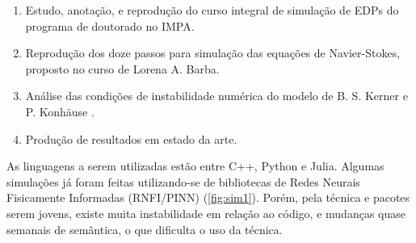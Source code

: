 \documentclass[12pt, brazilian]{article}
\begin{document}
\begin{enumerate}
\item Estudo, anotação, e reprodução do curso integral de simulação de
EDPs do programa de doutorado no IMPA.
\item Reprodução dos doze passos para simulação das equações de
Navier-Stokes, proposto no curso de Lorena A. Barba.








\item Análise das condições de instabilidade numérica do modelo de B. S. Kerner e P. Konhäuse \cite{kerner1993cluster}.
\item Produção de resultados em estado da arte.
\end{enumerate}

As linguagens a serem utilizadas estão entre C++, Python e Julia. Algumas simulações já foram feitas utilizando-se de bibliotecas de Redes Neurais Fisicamente Informadas (RNFI/PINN) (\autoref{fig:sim1}). Porém, pela técnica e pacotes serem jovens, existe muita instabilidade em relação ao código, e mudanças quase semanais de semântica, o que dificulta o uso da técnica.
\end{document}
